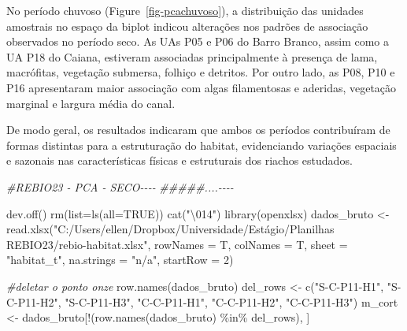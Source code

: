 \documentclass[
  letterpaper,
  DIV=11,
  numbers=noendperiod]{scrartcl}
\newenvironment{Shaded}{}{}
\newcommand{\AttributeTok}[1]{\textcolor[rgb]{0.49,0.56,0.16}{#1}}
\newcommand{\CommentTok}[1]{\textcolor[rgb]{0.38,0.63,0.69}{\textit{#1}}}
\newcommand{\ConstantTok}[1]{\textcolor[rgb]{0.53,0.00,0.00}{#1}}
\newcommand{\DecValTok}[1]{\textcolor[rgb]{0.25,0.63,0.44}{#1}}
\newcommand{\DocumentationTok}[1]{\textcolor[rgb]{0.73,0.13,0.13}{\textit{#1}}}
\newcommand{\FunctionTok}[1]{\textcolor[rgb]{0.02,0.16,0.49}{#1}}
\newcommand{\NormalTok}[1]{#1}
\newcommand{\OtherTok}[1]{\textcolor[rgb]{0.00,0.44,0.13}{#1}}
\newcommand{\SpecialCharTok}[1]{\textcolor[rgb]{0.25,0.44,0.63}{#1}}
\newcommand{\StringTok}[1]{\textcolor[rgb]{0.25,0.44,0.63}{#1}}
\begin{document}
No período chuvoso (Figure~\ref{fig-pcachuvoso}), a distribuição das
unidades amostrais no espaço da biplot indicou alterações nos padrões de
associação observados no período seco. As UAs P05 e P06 do Barro Branco,
assim como a UA P18 do Caiana, estiveram associadas principalmente à
presença de lama, macrófitas, vegetação submersa, folhiço e detritos.
Por outro lado, as P08, P10 e P16 apresentaram maior associação com
algas filamentosas e aderidas, vegetação marginal e largura média do
canal.

De modo geral, os resultados indicaram que ambos os períodos
contribuíram de formas distintas para a estruturação do habitat,
evidenciando variações espaciais e sazonais nas características físicas
e estruturais dos riachos estudados.

\begin{Shaded}
\begin{Highlighting}[numbers=left,,]
\CommentTok{\#REBIO23 {-} PCA {-} SECO{-}{-}{-}{-}}
\DocumentationTok{\#\#\#\#\#....{-}{-}{-}{-}}

\FunctionTok{dev.off}\NormalTok{()}
\FunctionTok{rm}\NormalTok{(}\AttributeTok{list=}\FunctionTok{ls}\NormalTok{(}\AttributeTok{all=}\ConstantTok{TRUE}\NormalTok{))}
\FunctionTok{cat}\NormalTok{(}\StringTok{"}\SpecialCharTok{\textbackslash{}014}\StringTok{"}\NormalTok{)}
\FunctionTok{library}\NormalTok{(openxlsx)}
\NormalTok{dados\_bruto }\OtherTok{\textless{}{-}} \FunctionTok{read.xlsx}\NormalTok{(}\StringTok{"C:/Users/ellen/Dropbox/Universidade/Estágio/Planilhas REBIO23/rebio{-}habitat.xlsx"}\NormalTok{,}
                         \AttributeTok{rowNames =}\NormalTok{ T,}
                         \AttributeTok{colNames =}\NormalTok{ T,}
                         \AttributeTok{sheet =} \StringTok{"habitat\_t"}\NormalTok{,}
                         \AttributeTok{na.strings =} \StringTok{"n/a"}\NormalTok{,}
                         \AttributeTok{startRow =} \DecValTok{2}\NormalTok{)}

\CommentTok{\#deletar o ponto onze}
\FunctionTok{row.names}\NormalTok{(dados\_bruto)}
\NormalTok{del\_rows }\OtherTok{\textless{}{-}} \FunctionTok{c}\NormalTok{(}\StringTok{"S{-}C{-}P11{-}H1"}\NormalTok{, }\StringTok{"S{-}C{-}P11{-}H2"}\NormalTok{, }\StringTok{"S{-}C{-}P11{-}H3"}\NormalTok{, }\StringTok{"C{-}C{-}P11{-}H1"}\NormalTok{, }\StringTok{"C{-}C{-}P11{-}H2"}\NormalTok{, }\StringTok{"C{-}C{-}P11{-}H3"}\NormalTok{)}
\NormalTok{m\_cort }\OtherTok{\textless{}{-}}\NormalTok{ dados\_bruto[}\SpecialCharTok{!}\NormalTok{(}\FunctionTok{row.names}\NormalTok{(dados\_bruto) }\SpecialCharTok{\%in\%}\NormalTok{ del\_rows), ]}


\end{Highlighting}
\end{Shaded}
\end{document}

